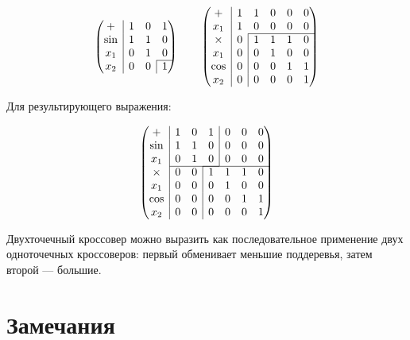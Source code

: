 \documentclass[12pt,a4paper]{amsart}
\begin{document}
$$
\begin{pmatrix}
  +			& \multicolumn{1}{|c}{1} & 0 & 1 \\
  \sin		& \multicolumn{1}{|c}{1} & 1 & 0 \\
  x_1		& \multicolumn{1}{|c}{0} & 1 & 0 \\ \cline{4-4}
  x_2		& \multicolumn{1}{|c}{0} & 0 &\multicolumn{1}{|c}{1}
\end{pmatrix}
\qquad
\begin{pmatrix}
  +			& \multicolumn{1}{|c}{1} &						1 & 0 & 0 & 0 \\
  x_1		& \multicolumn{1}{|c}{1} &						0 & 0 & 0 & 0 \\ \cline{3-6}
  \times	& \multicolumn{1}{|c}{0} & \multicolumn{1}{|c}{1} & 1 & 1 & 0 \\
  x_1		& \multicolumn{1}{|c}{0} & \multicolumn{1}{|c}{0} & 1 & 0 & 0 \\
  \cos		& \multicolumn{1}{|c}{0} & \multicolumn{1}{|c}{0} & 0 & 1 & 1 \\
  x_2		& \multicolumn{1}{|c}{0} & \multicolumn{1}{|c}{0} & 0 & 0 & 1
\end{pmatrix}
$$

Для результирующего выражения:

$$
\begin{pmatrix}
  +			& \multicolumn{1}{|c}{1} & 0 & \multicolumn{1}{c|}{1} & 0 & 0 & 0 \\
  \sin		& \multicolumn{1}{|c}{1} & 1 & \multicolumn{1}{c|}{0} & 0 & 0 & 0 \\
  x_1		& \multicolumn{1}{|c}{0} & 1 & \multicolumn{1}{c|}{0} & 0 & 0 & 0 \\ \cline{2-4} \cline{4-7}
  \times	& \multicolumn{1}{|c}{0} & 0 & \multicolumn{1}{|c}{1} & 1 & 1 & 0 \\
  x_1		& \multicolumn{1}{|c}{0} & 0 & \multicolumn{1}{|c}{0} & 1 & 0 & 0 \\
  \cos		& \multicolumn{1}{|c}{0} & 0 & \multicolumn{1}{|c}{0} & 0 & 1 & 1 \\
  x_2		& \multicolumn{1}{|c}{0} & 0 & \multicolumn{1}{|c}{0} & 0 & 0 & 1
\end{pmatrix}
$$

Двухточечный кроссовер можно выразить как последовательное применение двух одноточечных кроссоверов: первый обменивает
меньшие поддеревья, затем второй --- большие.

\section{Замечания}
\end{document}
